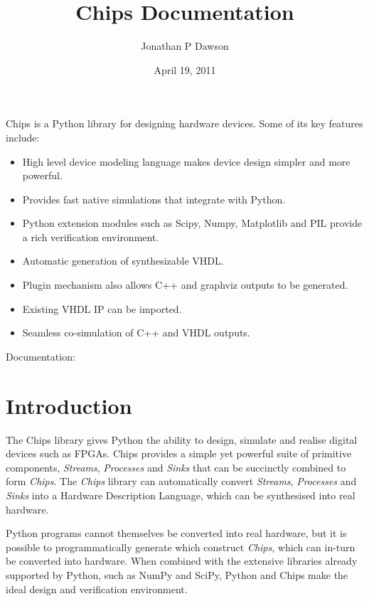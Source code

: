 \documentclass[letterpaper,10pt,english]{manual}
\title{Chips Documentation}
\date{April 19, 2011}
\author{Jonathan P Dawson}
\begin{document}
\maketitle
\tableofcontents
\hypertarget{--doc-index}{}


Chips is a Python library for designing hardware devices. Some of its key features include:
\begin{itemize}
\item {} 
High level device modeling language makes device design simpler and more
powerful.

\item {} 
Provides fast native simulations that integrate with Python.

\item {} 
Python extension modules such as Scipy, Numpy, Matplotlib and PIL provide a
rich verification environment.

\item {} 
Automatic generation of synthesizable VHDL.

\item {} 
Plugin mechanism also allows C++ and graphviz outputs to be generated.

\item {} 
Existing VHDL IP can be imported.

\item {} 
Seamless co-simulation of C++ and VHDL outputs.

\end{itemize}

Documentation:

\resetcurrentobjects
\hypertarget{--doc-introduction/index}{}

\chapter{Introduction}

The Chips library gives Python the ability to design, simulate and realise
digital devices such as FPGAs. Chips provides a simple yet powerful suite of
primitive components, \emph{Streams}, \emph{Processes} and \emph{Sinks} that can be
succinctly combined to form \emph{Chips}. The \emph{Chips} library can automatically
convert \emph{Streams}, \emph{Processes} and \emph{Sinks} into a Hardware Description
Language, which can be synthesised into real hardware.

Python programs cannot themselves be converted into real hardware, but it is
possible to programmatically generate which construct \emph{Chips}, which can
in-turn be converted into hardware. When combined with the extensive
libraries already supported by Python, such as NumPy and SciPy, Python and
Chips make the ideal design and verification environment.
\end{document}
